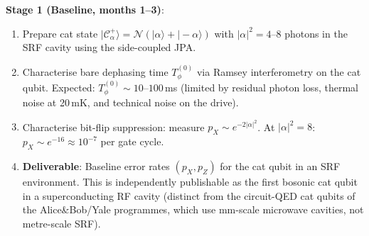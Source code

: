 \documentclass[11pt]{article}
\theoremstyle{definition}
\theoremstyle{remark}
\begin{document}
\begin{tcolorbox}[colback=blue!5!white, colframe=blue!60!black,
  title=\textbf{W4i16 TOP 5 FINDINGS --- READ FIRST}]
\begin{enumerate}[nosep]
  \textbf{Stage 1 (Baseline, months 1--3)}:
  \begin{enumerate}[nosep]
    \item Prepare cat state $|\mathcal{C}_\alpha^+\rangle =
      \mathcal{N}(|\alpha\rangle + |-\alpha\rangle)$ with
      $|\alpha|^2 = 4$--$8$ photons in the SRF cavity using the
      side-coupled JPA.
    \item Characterise bare dephasing time $T_\phi^{(0)}$ via Ramsey
      interferometry on the cat qubit.  Expected:
      $T_\phi^{(0)} \sim 10$--$100$\,ms (limited by residual photon
      loss, thermal noise at 20\,mK, and technical noise on the
      drive).
    \item Characterise bit-flip suppression: measure
      $p_X \sim e^{-2|\alpha|^2}$.  At $|\alpha|^2 = 8$:
      $p_X \sim e^{-16} \approx 10^{-7}$ per gate cycle.
    \item \textbf{Deliverable}: Baseline error rates $(p_X, p_Z)$
      for the cat qubit in an SRF environment.  This is independently
      publishable as the first bosonic cat qubit in a superconducting
      RF cavity (distinct from the circuit-QED cat qubits of the
      Alice\&Bob/Yale programmes, which use mm-scale microwave
      cavities, not metre-scale SRF).
  \end{enumerate}


\end{enumerate}
\end{tcolorbox}
\end{document}
